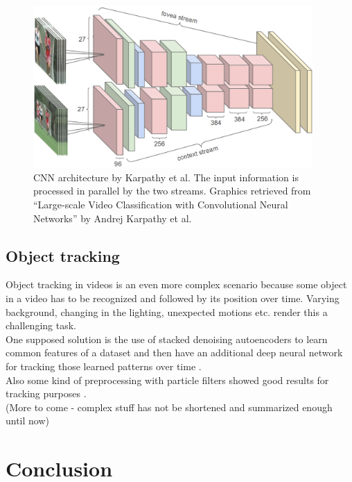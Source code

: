 \documentclass[12pt,twoside]{article}
\theoremstyle{plain}
\theoremstyle{definition}
\theoremstyle{remark}
\begin{document}
\begin{figure}[H]
	\centerline{
		\includegraphics[width=0.95\textwidth]{google-architecture.png}
	}
	{\caption{CNN architecture by Karpathy et al. The input information is processed in parallel by the two streams. Graphics retrieved from \enquote{Large-scale Video Classification with Convolutional Neural Networks} by Andrej Karpathy et al. \cite{GoogleLargeScaleVideoClassification-Karpathy}}\label{fig:google-architecture-two-streams}}
\end{figure}


\subsection{Object tracking}

Object tracking in videos is an even more complex scenario because some object in a video has to be recognized and followed by its position over time. Varying background, changing in the lighting, unexpected motions etc. render this a challenging task.
\\
One supposed solution is the use of stacked denoising autoencoders to learn common features of a dataset and then have an additional deep neural network for tracking those learned patterns over time \cite{LearningDeepCompactImageTracking-Wang}.
\\
Also some kind of preprocessing with particle filters showed good results for tracking purposes \cite{LearningDeepCompactImageTracking-Wang}.
\\
(More to come - complex stuff has not be shortened and summarized enough until now)



\section{Conclusion}
\label{sec:concl}
\end{document}

